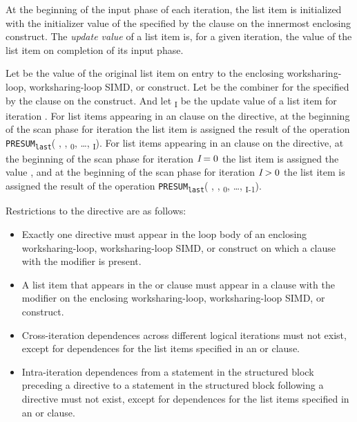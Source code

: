 At the beginning of the input phase of each iteration, the list item is
initialized with the initializer value of the 
specified by the  clause on the innermost enclosing construct.
The \textit{update value} of a list item is, for a given iteration, the value
of the list item on completion of its input phase. 

Let  be the value of the original list item on entry to the
enclosing worksharing-loop, worksharing-loop SIMD, or  construct. 
Let  be the combiner for the  specified 
by the  clause on the construct. And let \textsubscript{I} 
be the update value of a list item for iteration .  For list items 
appearing in an  clause on the  directive, at the 
beginning of the scan phase for iteration  the list item is assigned 
the result of the operation \texttt{PRESUM\textsubscript{last}}( , 
, \textsubscript{0}, \ldots, \textsubscript{I}).  
For list items appearing in an  clause on the  
directive, at the beginning of the scan phase for iteration $\plc{I} = 0$  
the list item is assigned the value , and at the beginning of 
the scan phase for iteration $\plc{I} > 0$  the list item is assigned the 
result of the operation \texttt{PRESUM\textsubscript{last}}( , 
, \textsubscript{0}, \ldots, \textsubscript{I-1}).


\restrictions
Restrictions to the  directive are as follows:

\begin{itemize}
\item Exactly one  directive must appear in the loop body of an
      enclosing worksharing-loop, worksharing-loop SIMD, or  
      construct on which a  clause with the  
      modifier is present.
\item A list item that appears in the  or 
      clause must appear in a  clause with the 
      modifier on the enclosing worksharing-loop, worksharing-loop SIMD, or 
       construct.
\item Cross-iteration dependences across different logical iterations must not
      exist, except for dependences for the list items specified in an
       or  clause.
\item Intra-iteration dependences from a statement in the structured block
      preceding a  directive to a statement in the structured block
      following a  directive must not exist, except for dependences
      for the list items specified in an  or 
      clause.
\end{itemize}

